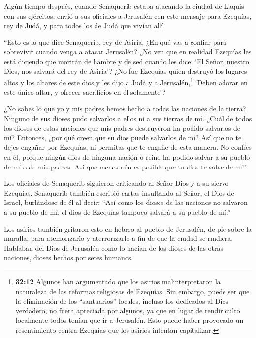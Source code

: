  Algún tiempo después, cuando Senaquerib estaba atacando la
ciudad de Laquis con sus ejércitos, envió a sus oficiales a Jerusalén
con este mensaje para Ezequías, rey de Judá, y para todos los de Judá
que vivían allí.

 ``Esto es lo que dice Senaquerib, rey de Asiria. ¿En qué
vas a confiar para sobrevivir cuando venga a atacar Jerusalén?
 ¿No ven que en realidad Ezequías les está diciendo que
morirán de hambre y de sed cuando les dice: `El Señor, nuestro Dios, nos
salvará del rey de Asiria'?  ¿No fue Ezequías quien
destruyó los lugares altos y los altares de este dios y les dijo a Judá
y a Jerusalén,\footnote{\textbf{32:12} Algunos han argumentado que los
  asirios malinterpretaron la naturaleza de las reformas religiosas de
  Ezequías. Sin embargo, puede ser que la eliminación de los
  ``santuarios'' locales, incluso los dedicados al Dios verdadero, no
  fuera apreciada por algunos, ya que en lugar de rendir culto
  localmente todos tenían que ir a Jerusalén. Esto puede haber provocado
  un resentimiento contra Ezequías que los asirios intentan capitalizar.}
`Deben adorar en este único altar, y ofrecer sacrificios en él
solamente'?

 ¿No sabes lo que yo y mis padres hemos hecho a todas las
naciones de la tierra? Ninguno de sus dioses pudo salvarlos a ellos ni a
sus tierras de mí.  ¿Cuál de todos los dioses de estas
naciones que mis padres destruyeron ha podido salvarlos de mí? Entonces,
¿por qué creen que su dios puede salvarlos de mí?  Así que
no te dejes engañar por Ezequías, ni permitas que te engañe de esta
manera. No confíes en él, porque ningún dios de ninguna nación o reino
ha podido salvar a su pueblo de mí o de mis padres. Así que menos aún es
posible que tu dios te salve de mí''.

 Los oficiales de Senaquerib siguieron criticando al Señor
Dios y a su siervo Ezequías.  Senaquerib también escribió
cartas insultando al Señor, el Dios de Israel, burlándose de él al
decir: ``Así como los dioses de las naciones no salvaron a su pueblo de
mí, el dios de Ezequías tampoco salvará a su pueblo de mí.''

 Los asirios también gritaron esto en hebreo al pueblo de
Jerusalén, de pie sobre la muralla, para atemorizarlo y aterrorizarlo a
fin de que la ciudad se rindiera.  Hablaban del Dios de
Jerusalén como lo hacían de los dioses de las otras naciones, dioses
hechos por seres humanos.

